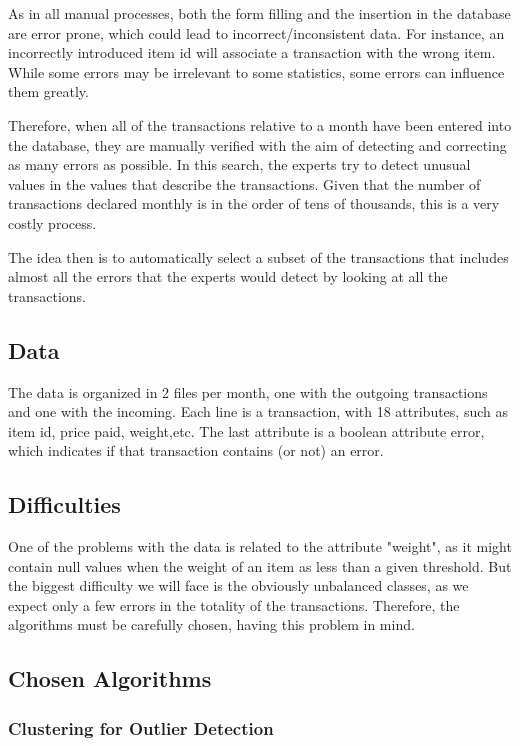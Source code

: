 \documentclass{llncs}
\begin{document}
As in all manual processes, both the form filling and the insertion in the database are error prone, which could lead to incorrect/inconsistent data. For instance, an incorrectly introduced item id will associate a transaction with the wrong item. While some errors may be irrelevant to some statistics, some errors can influence them greatly.

Therefore, when all of the transactions relative to a month have been entered into the database, they are manually verified with
the aim of detecting and correcting as many errors as possible. In this search, the experts try to detect unusual values in the values that describe the transactions.
Given that the number of transactions declared monthly is in the order of tens of thousands, this is a very costly process.

The idea then is to automatically select a subset of the
transactions that includes almost all the errors that the experts would detect by looking at all the transactions.

\subsection{Data}

The data is organized in 2 files per month, one with the outgoing transactions and one with the incoming. Each line is a transaction, with 18 attributes, such as item id, price paid, weight,etc. The last attribute is a boolean attribute error, which indicates if that transaction contains (or not) an error.

\subsection{Difficulties}

One of the problems with the data is related to the attribute "weight", as it might contain null values when the weight of an item as less than a given threshold. But the biggest difficulty we will face is
the obviously unbalanced classes, as we expect only a few errors in the totality of the transactions. Therefore, the algorithms must be carefully chosen, having this problem in mind.

\subsection{Chosen Algorithms}

\subsubsection{Clustering for Outlier Detection}
\end{document}
